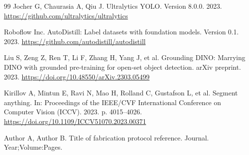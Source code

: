 \documentclass[pdflatex,sn-mathphys-num,iicol]{sn-jnl}
\theoremstyle{thmstyleone}
\theoremstyle{thmstyletwo}
\theoremstyle{thmstylethree}
\begin{document}
\begin{thebibliography}{99}
Jocher G, Chaurasia A, Qiu J.
Ultralytics YOLO. Version 8.0.0.
2023. \url{https://github.com/ultralytics/ultralytics}

Roboflow Inc.
AutoDistill: Label datasets with foundation models.
Version 0.1.
2023. \url{https://github.com/autodistill/autodistill}

Liu S, Zeng Z, Ren T, Li F, Zhang H, Yang J, et al.
Grounding DINO: Marrying DINO with grounded pre-training for
open-set object detection.
arXiv preprint. 2023.
\url{https://doi.org/10.48550/arXiv.2303.05499}

Kirillov A, Mintun E, Ravi N, Mao H, Rolland C, Gustafson L, et al.
Segment anything.
In: Proceedings of the IEEE/CVF International Conference on Computer
Vision (ICCV). 2023. p. 4015--4026.
\url{https://doi.org/10.1109/ICCV51070.2023.00371}

Author A, Author B.
Title of fabrication protocol reference.
Journal. Year;Volume:Pages.

\end{thebibliography}
\end{document}
